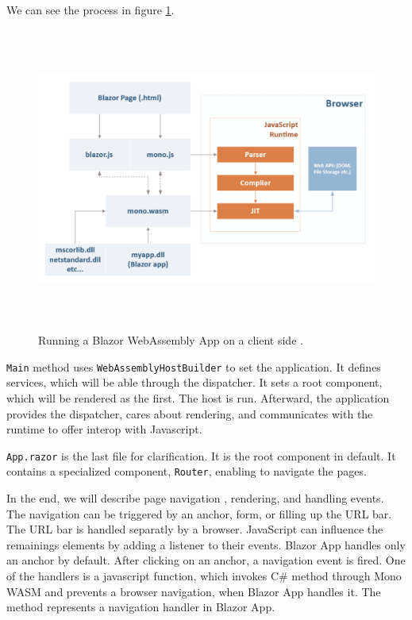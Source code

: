 We can see the process in figure \ref{img08:wasm}.
\par
\begin{figure}\centering
\includegraphics[width=140mm, height=100mm]{./img/BlazorExecution}
\caption{Running a Blazor WebAssembly App on a client side \cite{online:composition}.}
\label{img08:wasm}
\end{figure}
\par
\texttt{Main} method uses \texttt{WebAssemblyHostBuilder} to set the application.
It defines services, which will be able through the dispatcher.
It sets a root component, which will be rendered as the first.
The host is run.
Afterward, the application provides the dispatcher, cares about rendering, and communicates with the runtime to offer interop with Javascript.
\par
\texttt{App.razor} is the last file for clarification.
It is the root component in default.
It contains a specialized component, \texttt{Router}, enabling to navigate the pages.
\par
In the end, we will describe page navigation \cite{online:routing}, rendering, and handling events.
The navigation can be triggered by an anchor, form, or filling up the URL bar.
The URL bar is handled separatly by a browser.
JavaScript can influence the remainings elements by adding a listener to their events.
Blazor App handles only an anchor by default.
After clicking on an anchor, a navigation event is fired.
One of the handlers is a javascript function, which invokes C\# method through Mono WASM and prevents a browser navigation, when Blazor App handles it. 
The method represents a navigation handler in Blazor App.
